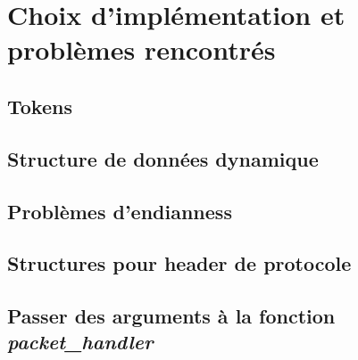 \documentclass[a4paper]{article}
\begin{document}
\section{Choix d'implémentation et problèmes rencontrés} \label{sec:implspec}





\subsection{Tokens} \label{subsec:tokens}








\subsection{Structure de données dynamique}








\subsection{Problèmes d'endianness}








\subsection{Structures pour header de protocole}








\subsection{Passer des arguments à la fonction \textit{packet\_handler}}



\end{document}
